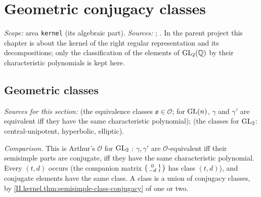 
\chapter{Geometric conjugacy classes}\label{ch:ch-03-kernel}

\noindent\emph{Scope:} area \texttt{kernel} (its algebraic part). \emph{Sources:} \cite[§10]{AIntro}; \cite[Lecture II §1]{Gel}.
In the parent project this chapter is about the kernel of the right regular representation and its decompositions; only the
classification of the elements of $\mathrm{GL}_2(\mathbb{Q})$ by their characteristic polynomials is kept here.

\section{Geometric classes}\label{sec:kernel-classes}

\noindent\emph{Sources for this section:} \cite[§10, pp.~53--54]{AIntro} (the equivalence classes $\mathfrak o\in\mathcal O$; for $\mathrm{GL}(n)$, $\gamma$ and $\gamma'$ are
equivalent iff they have the same characteristic polynomial); \cite[Lecture II §1]{Gel} (the classes for $\mathrm{GL}_2$: central-unipotent, hyperbolic, elliptic).

\begin{definition}
\end{definition}
\noindent\emph{Comparison.} This is Arthur's $\mathcal O$ for $\mathrm{GL}_2$ \cite[§10, p.~54]{AIntro}: $\gamma,\gamma'$ are $\mathcal O$-equivalent iff their semisimple parts are
conjugate, iff they have the same characteristic polynomial. Every $(t,d)$ occurs (the companion matrix $\begin{psmallmatrix}0&1\\-d&t\end{psmallmatrix}$ has
class $(t,d)$), and conjugate elements have the same class. A class is a union of conjugacy classes, by \cref{II.kernel.thm:semisimple-class-conjugacy} of one
or two.

